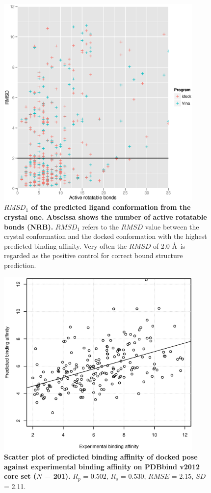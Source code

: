 \documentclass[10pt]{article}
\begin{document}
\begin{figure}[!ht]
\begin{center}
\includegraphics[width=4in]{NRB-RMSD.eps}
\end{center}
\caption{
{\bf $RMSD_1$ of the predicted ligand conformation from the crystal one. Abscissa shows the number of active rotatable bonds (NRB).} $RMSD_1$ refers to the $RMSD$ value between the crystal conformation and the docked conformation with the highest predicted binding affinity. Very often the $RMSD$ of 2.0 \AA\ is regarded as the positive control for correct bound structure prediction.
}
\label{NRB-RMSD}
\end{figure}

\begin{figure}[!ht]
\begin{center}
\includegraphics[width=4in]{pK-idockConf1idock.eps}
\end{center}
\caption{
{\bf Scatter plot of predicted binding affinity of docked pose against experimental binding affinity on PDBbind v2012 core set ($N$ = 201).} $R_p$ = 0.502, $R_s$ = 0.530, $RMSE$ = 2.15, $SD$ = 2.11.
}
\label{pK-idockConf1idock}
\end{figure}
\end{document}
